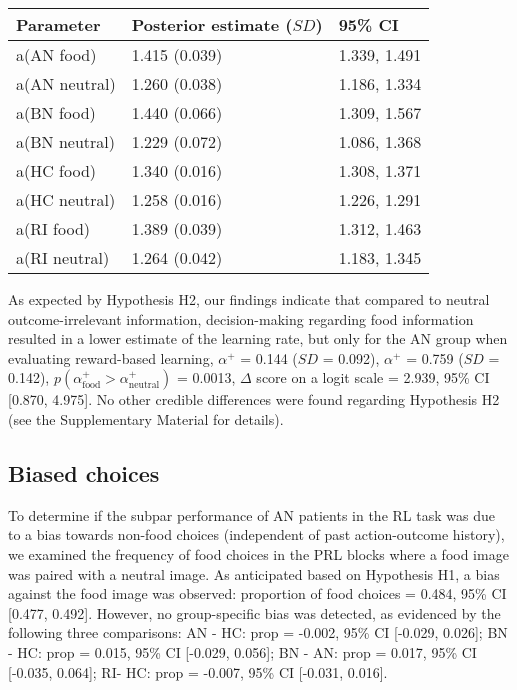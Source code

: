 \documentclass[
  man,floatsintext]{apa6}
\begin{document}
\begin{longtable}[]{@{}lll@{}}
\toprule\noalign{}
Parameter & Posterior estimate (\(SD\)) & 95\% CI \\
\midrule\noalign{}
\endhead
\bottomrule\noalign{}
\endlastfoot
a(AN food) & 1.415 (0.039) & 1.339, 1.491 \\
a(AN neutral) & 1.260 (0.038) & 1.186, 1.334 \\
a(BN food) & 1.440 (0.066) & 1.309, 1.567 \\
a(BN neutral) & 1.229 (0.072) & 1.086, 1.368 \\
a(HC food) & 1.340 (0.016) & 1.308, 1.371 \\
a(HC neutral) & 1.258 (0.016) & 1.226, 1.291 \\
a(RI food) & 1.389 (0.039) & 1.312, 1.463 \\
a(RI neutral) & 1.264 (0.042) & 1.183, 1.345 \\
\end{longtable}

As expected by Hypothesis H2, our findings indicate that compared to neutral outcome-irrelevant information, decision-making regarding food information resulted in a lower estimate of the learning rate, but only for the AN group when evaluating reward-based learning, \(\alpha^+\) = 0.144 (\(SD\) = 0.092), \(\alpha^+\) = 0.759 (\(SD\) = 0.142), \(p(\alpha^+_\text{food} > \alpha^+_\text{neutral})\) = 0.0013, \(\Delta\) score on a logit scale = 2.939, 95\% CI {[}0.870, 4.975{]}. No other credible differences were found regarding Hypothesis H2 (see the Supplementary Material for details).

\hypertarget{biased-choices}{%
\subsection{Biased choices}\label{biased-choices}}

To determine if the subpar performance of AN patients in the RL task was due to a bias towards non-food choices (independent of past action-outcome history), we examined the frequency of food choices in the PRL blocks where a food image was paired with a neutral image. As anticipated based on Hypothesis H1, a bias against the food image was observed: proportion of food choices = 0.484, 95\% CI {[}0.477, 0.492{]}. However, no group-specific bias was detected, as evidenced by the following three comparisons: AN - HC: prop = -0.002, 95\% CI {[}-0.029, 0.026{]}; BN - HC: prop = 0.015, 95\% CI {[}-0.029, 0.056{]}; BN - AN: prop = 0.017, 95\% CI {[}-0.035, 0.064{]}; RI- HC: prop = -0.007, 95\% CI {[}-0.031, 0.016{]}.
\end{document}
